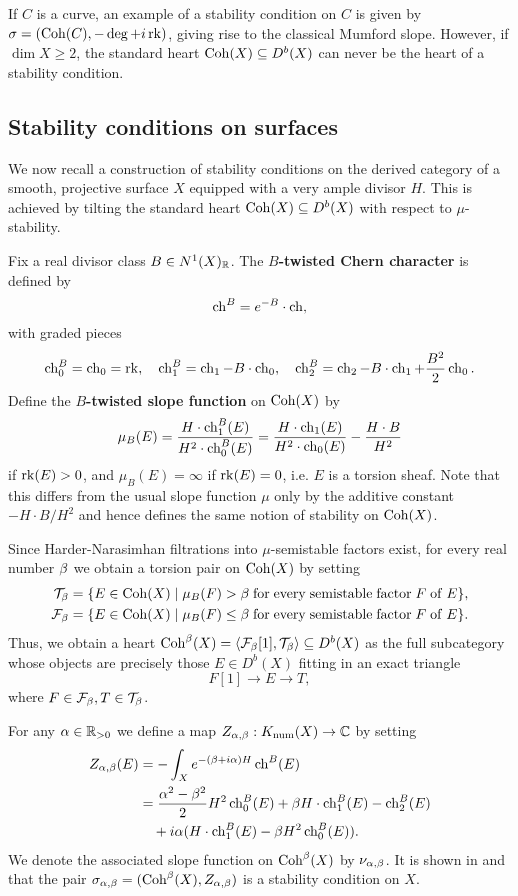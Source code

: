 \documentclass[letterpaper,12pt]{amsart}
\theoremstyle{remark}
\begin{document}
If $C$ is a curve, an example of a stability condition on $C$ is given by $\sigma = (\mathrm{Coh}(C), -\deg + i \operatorname{\mathrm{rk}})$, giving rise to the classical Mumford slope. However, if $\dim X \ge 2$, the standard heart $\mathrm{Coh}(X) \subseteq D^b(X)$ can never be the heart of a stability condition. 


\subsection{Stability conditions on surfaces}\label{section:stabcondsurf}
We now recall a construction of stability conditions on the derived category of a smooth, projective surface $X$ equipped with a very ample divisor $H$. This is achieved by tilting the standard heart $\mathrm{Coh}(X) \subseteq D^b(X)$ with respect to $\mu$-stability. 

Fix a real divisor class $B \in N^1(X)_{\mathbb{R}}$. The {\bf $B$-twisted Chern character} is defined by
\[ \operatorname{\mathrm{ch}}^B = e^{-B}\cdot \operatorname{\mathrm{ch}}, \]
with graded pieces
\[ \operatorname{\mathrm{ch}}^B_0 = \operatorname{\mathrm{ch}}_0 = \operatorname{\mathrm{rk}}, \quad \operatorname{\mathrm{ch}}^B_1 = \operatorname{\mathrm{ch}}_1 - B \cdot \operatorname{\mathrm{ch}}_0, \quad \operatorname{\mathrm{ch}}^B_2 = \operatorname{\mathrm{ch}}_2 - B \cdot \operatorname{\mathrm{ch}}_1 + \frac{B^2}{2} \operatorname{\mathrm{ch}}_0. \]
Define the {\bf $B$-twisted slope function} on $\mathrm{Coh}(X)$ by
\[ \mu_B(E) = \frac{H \cdot \operatorname{\mathrm{ch}}^B_1(E)}{H^2 \cdot \operatorname{\mathrm{ch}}^B_0(E)} = \frac{H \cdot \operatorname{\mathrm{ch}}_1(E)}{H^2 \cdot \operatorname{\mathrm{ch}}_0(E)} - \frac{H \cdot B}{H^2} \]
if $\operatorname{\mathrm{rk}}(E) > 0$, and $\mu_B(E) = \infty$ if $\operatorname{\mathrm{rk}}(E) = 0$, i.e. $E$ is a torsion sheaf. Note that this differs from the usual slope function $\mu$ only by the additive constant $-H\cdot B/H^2$ and hence defines the same notion of stability on $\mathrm{Coh}(X)$. 

Since Harder-Narasimhan filtrations into $\mu$-semistable factors exist, for every real number $\beta$ we obtain a torsion pair on $\mathrm{Coh}(X)$ by setting
\begin{align*}
    \mathcal{T}_\beta & = \{ E \in \mathrm{Coh}(X) \;|\; \mu_B(F) > \beta \mathrm{\;for\;every\;semistable\;factor\;} F \mathrm{\;of\;} E \}, \\
    \mathcal{F}_\beta & = \{ E \in \mathrm{Coh}(X) \;|\; \mu_B(F) \le \beta \mathrm{\;for\;every\;semistable\;factor\;} F \mathrm{\;of\;} E \}.
\end{align*}
Thus, we obtain a heart $\mathrm{Coh}^\beta(X) = \langle \mathcal{F}_\beta[1], \mathcal{T}_\beta \rangle \subseteq D^b(X)$ as the full subcategory whose objects are precisely those $E \in D^b(X)$ fitting in an exact triangle
\[ F[1] \to E \to T, \]
where $F \in \mathcal{F}_\beta, T \in \mathcal{T}_\beta$. 

For any $\alpha \in \mathbb{R}_{>0}$ we define a map $Z_{\alpha,\beta}: K_{\mathrm{num}}(X) \to \mathbb{C}$ by setting
\begin{align*}
    Z_{\alpha, \beta}(E) & = -\int_X e^{-(\beta + i \alpha)H} \operatorname{\mathrm{ch}}^B(E) \\
    & = \frac{\alpha^2 - \beta^2}{2} H^2 \operatorname{\mathrm{ch}}^B_0(E) + \beta H\cdot\operatorname{\mathrm{ch}}^B_1(E) - \operatorname{\mathrm{ch}}^B_2(E) \\
    & \quad  + i\alpha(H \cdot \operatorname{\mathrm{ch}}^B_1(E) - \beta H^2 \operatorname{\mathrm{ch}}^B_0(E)).
\end{align*}
We denote the associated slope function on $\mathrm{Coh}^\beta(X)$ by $\nu_{\alpha,\beta}$. It is shown in \cite{bridgelandK3} and \cite{ABL13} that the pair $\sigma_{\alpha,\beta} = (\mathrm{Coh}^\beta(X), Z_{\alpha,\beta})$ is a stability condition on $X$. 
\end{document}
